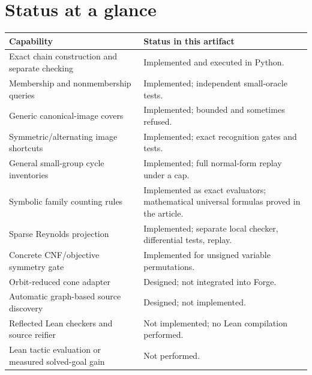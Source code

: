 \section{Status at a glance}
\begin{tabularx}{\textwidth}{@{}p{}Y@{}}
\toprule
Capability & Status in this artifact\\
\midrule
Exact chain construction and separate checking & Implemented and executed in Python.\\
Membership and nonmembership queries & Implemented; independent small-oracle tests.\\
Generic canonical-image covers & Implemented; bounded and sometimes refused.\\
Symmetric/alternating image shortcuts & Implemented; exact recognition gates and tests.\\
General small-group cycle inventories & Implemented; full normal-form replay under a cap.\\
Symbolic family counting rules & Implemented as exact evaluators; mathematical universal formulas proved in the article.\\
Sparse Reynolds projection & Implemented; separate local checker, differential tests, replay.\\
Concrete CNF/objective symmetry gate & Implemented for unsigned variable permutations.\\
Orbit-reduced cone adapter & Designed; not integrated into Forge.\\
Automatic graph-based source discovery & Designed; not implemented.\\
Reflected Lean checkers and source reifier & Not implemented; no Lean compilation performed.\\
Lean tactic evaluation or measured solved-goal gain & Not performed.\\
\bottomrule
\end{tabularx}
